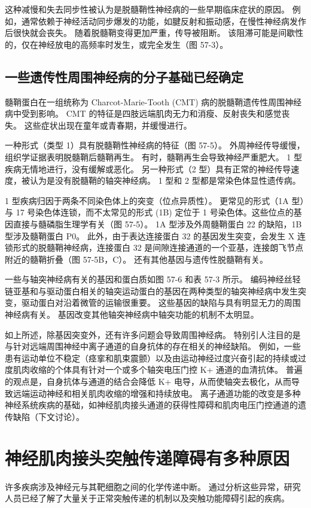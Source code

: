 这种减慢和失去同步性被认为是脱髓鞘性神经病的一些早期临床症状的原因。 例如，通常依赖于神经活动同步爆发的功能，如腱反射和振动感，在慢性神经病发作后很快就会丧失。 随着脱髓鞘变得更加严重，传导被阻断。 该阻滞可能是间歇性的，仅在神经放电的高频率时发生，或完全发生（图 57-3）。

\subsection{一些遗传性周围神经病的分子基础已经确定}
髓鞘蛋白在一组统称为 Charcot-Marie-Tooth (CMT) 病的脱髓鞘遗传性周围神经病中受到影响。 CMT 的特征是四肢远端肌肉无力和消瘦、反射丧失和感觉丧失。 这些症状出现在童年或青春期，并缓慢进行。

一种形式（类型 1）具有脱髓鞘性神经病的特征（图 57-5）。 外周神经传导缓慢，组织学证据表明脱髓鞘后髓鞘再生。 有时，髓鞘再生会导致神经严重肥大。 1 型疾病无情地进行，没有缓解或恶化。 另一种形式（2 型）具有正常的神经传导速度，被认为是没有脱髓鞘的轴突神经病。 1 型和 2 型都是常染色体显性遗传病。

1 型疾病归因于两条不同染色体上的突变（位点异质性）。 更常见的形式（1A 型）与 17 号染色体连锁，而不太常见的形式 (1B) 定位于 1 号染色体。这些位点的基因直接与髓磷脂生理学有关（图 57-5）。 1A 型涉及外周髓鞘蛋白 22 的缺陷，1B 型涉及髓鞘蛋白 P0。 此外，由于表达连接蛋白 32 的基因发生突变，会发生 X 连锁形式的脱髓鞘神经病，连接蛋白 32 是间隙连接通道的一个亚基，连接朗飞节点附近的髓鞘折叠（图 57-5B，C）。 还有其他基因与遗传性脱髓鞘有关。

一些与轴突神经病有关的基因和蛋白质如图 57-6 和表 57-3 所示。 编码神经丝轻链亚基和与驱动蛋白相关的轴突运动蛋白的基因在两种类型的轴突神经病中发生突变，驱动蛋白对沿着微管的运输很重要。 这些基因的缺陷与具有明显无力的周围神经病有关。 基因改变其他轴突神经病中轴突功能的机制不太明显。

如上所述，除基因突变外，还有许多问题会导致周围神经病。 特别引人注目的是与针对远端周围神经中离子通道的自身抗体的存在相关的神经缺陷。 例如，一些患有运动单位不稳定（痉挛和肌束震颤）以及由运动神经过度兴奋引起的持续或过度肌肉收缩的个体具有针对一个或多个轴突电压门控 K+ 通道的血清抗体。 普遍的观点是，自身抗体与通道的结合会降低 K+ 电导，从而使轴突去极化，从而导致远端运动神经和相关肌肉收缩的增强和持续放电。 离子通道功能的改变是多种神经系统疾病的基础，如神经肌肉接头通道的获得性障碍和肌肉电压门控通道的遗传缺陷（下文讨论）。


\section{神经肌肉接头突触传递障碍有多种原因}
许多疾病涉及神经元与其靶细胞之间的化学传递中断。 通过分析这些异常，研究人员已经了解了大量关于正常突触传递的机制以及突触功能障碍引起的疾病。

